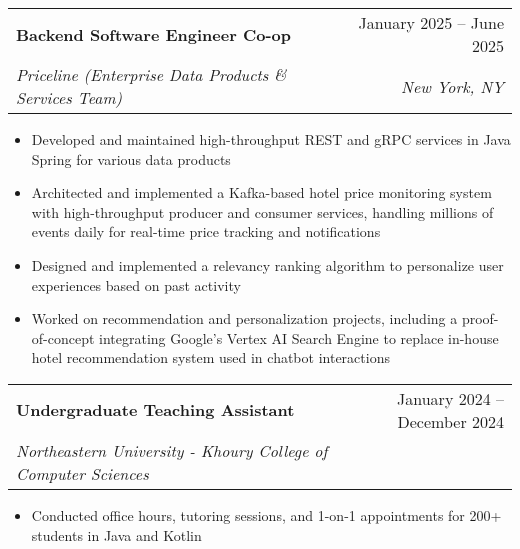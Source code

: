 \documentclass[letterpaper,11pt]{article}
\makeatletter
\newcommand{\resumeItem}[1]{
  \item\small{
    {#1 \vspace{-2pt}}
  }
}
\newcommand{\resumeSubheading}[4]{
  \vspace{-2pt}\item
    \begin{tabular*}{0.97\textwidth}[t]{l@{\extracolsep{\fill}}r}
      \textbf{#1} & #2 \\
      \textit{\small#3} & \textit{\small #4} \\
    \end{tabular*}\vspace{-7pt}
}
\newcommand{\resumeSubSubheading}[2]{
    \item
    \begin{tabular*}{0.97\textwidth}{l@{\extracolsep{\fill}}r}
      \textit{\small#1} & \textit{\small #2} \\
    \end{tabular*}\vspace{-7pt}
}
\newcommand{\resumeItemListStart}{\begin{itemize}}
\newcommand{\resumeItemListEnd}{\end{itemize}\vspace{-5pt}}
\makeatother
\begin{document}

  \resumeSubheading
  {Backend Software Engineer Co-op}{January 2025 -- June 2025}
  {Priceline (Enterprise Data Products \& Services Team)}{New York, NY}
  \resumeItemListStart
    \resumeItem{Developed and maintained high-throughput REST and gRPC services in Java Spring for various data products}%
    \resumeItem{Architected and implemented a Kafka-based hotel price monitoring system with high-throughput producer and consumer services, handling millions of events daily for real-time price tracking and notifications}
    \resumeItem{Designed and implemented a relevancy ranking algorithm to personalize user experiences based on past activity}
    \resumeItem{Worked on recommendation and personalization projects, including a proof-of-concept integrating Google's Vertex AI Search Engine to replace in-house hotel recommendation system used in chatbot interactions}
  \resumeItemListEnd

  \resumeSubheading
    {Undergraduate Teaching Assistant}{January 2024 -- December 2024}
    {Northeastern University - Khoury College of Computer Sciences}{}
    \resumeItemListStart
      \resumeItem{Conducted office hours, tutoring sessions, and 1-on-1 appointments for 200+ students in Java and Kotlin}
    \resumeItemListEnd
    
\end{document}

